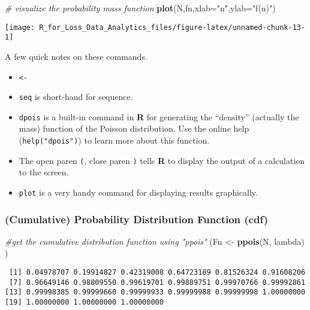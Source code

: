 \documentclass[]{book}
\newenvironment{Shaded}{\begin{snugshade}}{\end{snugshade}}
\newcommand{\KeywordTok}[1]{\textcolor[rgb]{0.13,0.29,0.53}{\textbf{#1}}}
\newcommand{\DataTypeTok}[1]{\textcolor[rgb]{0.13,0.29,0.53}{#1}}
\newcommand{\StringTok}[1]{\textcolor[rgb]{0.31,0.60,0.02}{#1}}
\newcommand{\CommentTok}[1]{\textcolor[rgb]{0.56,0.35,0.01}{\textit{#1}}}
\newcommand{\NormalTok}[1]{#1}
\providecommand{\tightlist}{%
  \setlength{\itemsep}{0pt}\setlength{\parskip}{0pt}}
\theoremstyle{definition}
\theoremstyle{definition}
\theoremstyle{definition}
\theoremstyle{remark}
\begin{document}
\begin{Shaded}
\begin{Highlighting}[]
\CommentTok{# visualize the probability mass function }
\KeywordTok{plot}\NormalTok{(N,fn,}\DataTypeTok{xlab=}\StringTok{"n"}\NormalTok{,}\DataTypeTok{ylab=}\StringTok{"f(n)"}\NormalTok{) }
\end{Highlighting}
\end{Shaded}

\begin{center}\texttt{[image: R\_for\_Loss\_Data\_Analytics\_files/figure-latex/unnamed-chunk-13-1]} \end{center}

A few quick notes on these commands.

\begin{itemize}
\tightlist
\item
  \texttt{\textless{}-}
\item
  \texttt{seq} is short-hand for sequence.
\item
  \texttt{dpois} is a built-in command in \textbf{R} for generating the
  ``density'' (actually the mass) function of the Poisson distribution.
  Use the online help (\texttt{help("dpois")}) to learn more about this
  function.
\item
  The open paren \texttt{(}, close paren \texttt{)} tells \textbf{R} to
  display the output of a calculation to the screen.
\item
  \texttt{plot} is a very handy command for displaying results
  graphically.
\end{itemize}

\subsubsection{(Cumulative) Probability Distribution Function
(cdf)}\label{cumulative-probability-distribution-function-cdf}

\begin{Shaded}
\begin{Highlighting}[]
\CommentTok{#get the cumulative distribution function using "ppois"}
\NormalTok{(Fn <-}\StringTok{ }\KeywordTok{ppois}\NormalTok{(N, lambda) )}
\end{Highlighting}
\end{Shaded}

\begin{verbatim}
 [1] 0.04978707 0.19914827 0.42319008 0.64723189 0.81526324 0.91608206
 [7] 0.96649146 0.98809550 0.99619701 0.99889751 0.99970766 0.99992861
[13] 0.99998385 0.99999660 0.99999933 0.99999988 0.99999998 1.00000000
[19] 1.00000000 1.00000000 1.00000000
\end{verbatim}
\end{document}
